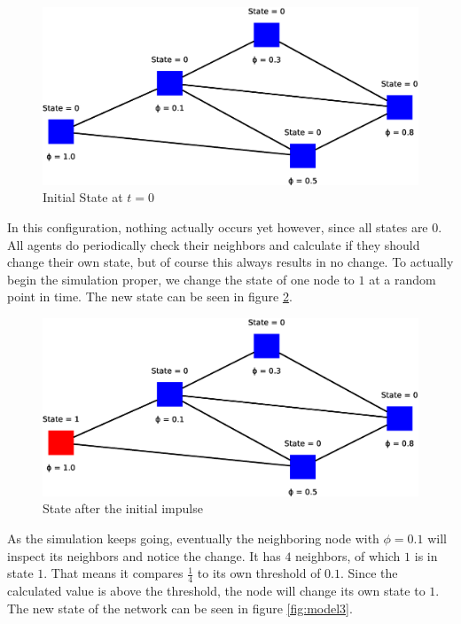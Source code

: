 \documentclass{sig-alternate-05-2015}
\begin{document}
\begin{figure}[h!]
    \includegraphics[width=\columnwidth]{../presentation/img/model4}
    \centering
    \caption{Initial State at $t = 0$}
    \label{fig:model1}
\end{figure}

In this configuration, nothing actually occurs yet however, since all states are $0$. All agents do periodically check their neighbors and calculate if they should change their own state, but of course this always results in no change. To actually begin the simulation proper, we change the state of one node to $1$ at a random point in time. The new state can be seen in figure \ref{fig:model2}.

\begin{figure}[h!]
    \includegraphics[width=\columnwidth]{../presentation/img/model5}
    \centering
    \caption{State after the initial impulse}
    \label{fig:model2}
\end{figure}

As the simulation keeps going, eventually the neighboring node with $\phi = 0.1$ will inspect its neighbors and notice the change. It has $4$ neighbors, of which $1$ is in state $1$. That means it compares $\frac{1}{4}$ to its own threshold of $0.1$. Since the calculated value is above the threshold, the node will change its own state to $1$. The new state of the network can be seen in figure \ref{fig:model3}.
\end{document}

